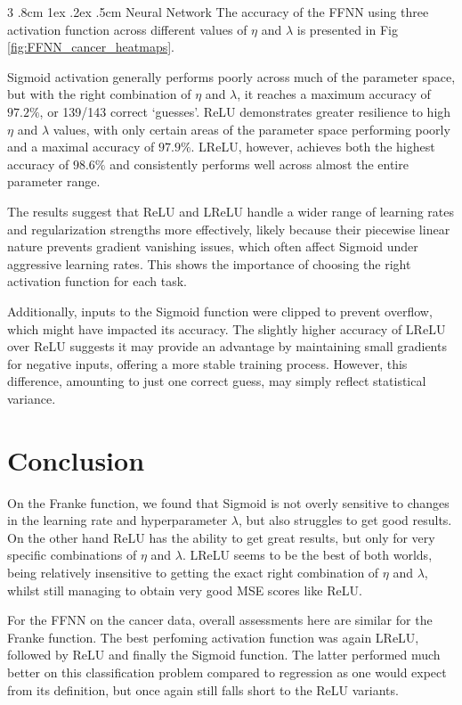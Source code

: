 \documentclass[%
reprint,s
amsmath,amssymb,
aps,
]{revtex4-2}
\makeatletter
\renewcommand{\subsubsection}{%
	\@startsection
	{subsubsection}%
	{3}%
	{\z@}%
	{.8cm \@plus1ex \@minus .2ex}%
	{.5cm}%
	{\normalfont\small\centering}%
}
\makeatother
\begin{document}
\subsubsection{Neural Network}  
The accuracy of the FFNN using three activation function across different values of $\eta$ and $\lambda$ is presented in Fig \ref{fig:FFNN_cancer_heatmaps}. 

Sigmoid activation generally performs poorly across much of the parameter space, but with the right combination of $\eta$ and $\lambda$, it reaches a maximum accuracy of $97.2\%$, or 139/143 correct `guesses'.  ReLU demonstrates greater resilience to high $\eta$ and $\lambda$ values, with only certain areas of the parameter space performing poorly and a maximal accuracy of $97.9\%$. LReLU, however, achieves both the highest accuracy of $98.6\%$ and consistently performs well across almost the entire parameter range.

The results suggest that ReLU and LReLU handle a wider range of learning rates and regularization strengths more effectively, likely because their piecewise linear nature prevents gradient vanishing issues, which often affect Sigmoid under aggressive learning rates. This shows the importance of choosing the right activation function for each task. 

Additionally, inputs to the Sigmoid function were clipped to prevent overflow, which might have impacted its accuracy. The slightly higher accuracy of LReLU over ReLU suggests it may provide an advantage by maintaining small gradients for negative inputs, offering a more stable training process. However, this difference, amounting to just one correct guess, may simply reflect statistical variance.

\section{Conclusion}
On the Franke function, we found that Sigmoid is not overly sensitive to changes in the learning rate and hyperparameter $\lambda$, but also struggles to get good results. On the other hand ReLU has the ability to get great results, but only for very specific combinations of $\eta$ and $\lambda$. LReLU seems to be the best of both worlds, being relatively insensitive to getting the exact right combination of $\eta$ and $\lambda$, whilst still managing to obtain very good MSE scores like ReLU.

For the FFNN on the cancer data, overall assessments here are similar for the Franke function. The best perfoming activation function was again LReLU, followed by ReLU and finally the Sigmoid function. The latter performed much better on this classification problem compared to regression as one would expect from its definition, but once again still falls short to the ReLU variants.
\end{document}
